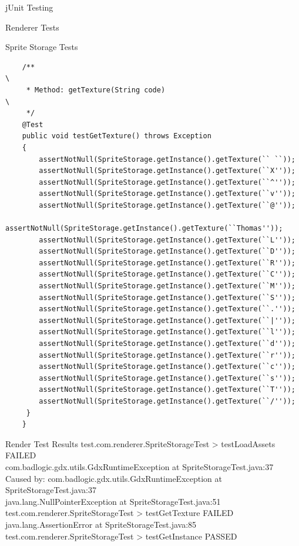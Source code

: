 \documentclass[12pt]{report}
\begin{document}
\begin{chapter}{jUnit Testing}
\begin{section}{Renderer Tests}
\begin{subsection}{Sprite Storage Tests}
\begin{lstlisting}
    /**                                                                                  \  
     * Method: getTexture(String code)                                                   \
     */
    @Test
    public void testGetTexture() throws Exception
    {
        assertNotNull(SpriteStorage.getInstance().getTexture(`` ``));                     
        assertNotNull(SpriteStorage.getInstance().getTexture(``X''));
        assertNotNull(SpriteStorage.getInstance().getTexture(``^''));
        assertNotNull(SpriteStorage.getInstance().getTexture(``v''));
        assertNotNull(SpriteStorage.getInstance().getTexture(``@''));
        assertNotNull(SpriteStorage.getInstance().getTexture(``Thomas''));
        assertNotNull(SpriteStorage.getInstance().getTexture(``L''));
        assertNotNull(SpriteStorage.getInstance().getTexture(``D''));
        assertNotNull(SpriteStorage.getInstance().getTexture(``R''));
        assertNotNull(SpriteStorage.getInstance().getTexture(``C''));
        assertNotNull(SpriteStorage.getInstance().getTexture(``M''));
        assertNotNull(SpriteStorage.getInstance().getTexture(``S''));
        assertNotNull(SpriteStorage.getInstance().getTexture(``.''));
        assertNotNull(SpriteStorage.getInstance().getTexture(``|''));
        assertNotNull(SpriteStorage.getInstance().getTexture(``l''));
        assertNotNull(SpriteStorage.getInstance().getTexture(``d''));
        assertNotNull(SpriteStorage.getInstance().getTexture(``r''));
        assertNotNull(SpriteStorage.getInstance().getTexture(``c''));
        assertNotNull(SpriteStorage.getInstance().getTexture(``s''));
        assertNotNull(SpriteStorage.getInstance().getTexture(``T''));
        assertNotNull(SpriteStorage.getInstance().getTexture(``/''));
     }
    }

    \end{lstlisting}
   \end{subsection}
  \end{section}
  \begin{section}{Render Test Results}
  	test.com.renderer.SpriteStorageTest > testLoadAssets FAILED\\
    	\hspace{4ex}com.badlogic.gdx.utils.GdxRuntimeException at SpriteStorageTest.java:37\\
        \hspace{4ex}Caused by: com.badlogic.gdx.utils.GdxRuntimeException at SpriteStorageTest.java:37\\
    	\hspace{4ex}java.lang.NullPointerException at SpriteStorageTest.java:51\\

	test.com.renderer.SpriteStorageTest > testGetTexture FAILED\\
	\hspace{4ex}java.lang.AssertionError at SpriteStorageTest.java:85\\
	
	test.com.renderer.SpriteStorageTest > testGetInstance PASSED
  \end{section}
 \end{chapter}
\end{document}
